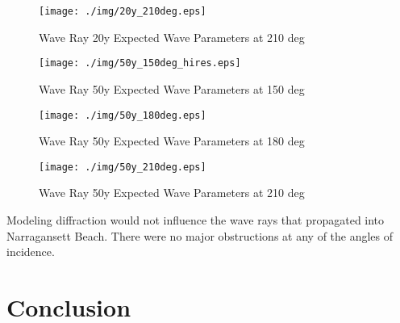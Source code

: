 \begin{figure}[H]
\centering
\texttt{[image: ./img/20y\_210deg.eps]}
\caption{Wave Ray 20y Expected Wave Parameters at 210 deg}
\label{fig:prob4WHvWD}
\end{figure}



\begin{figure}[H]
\centering
\texttt{[image: ./img/50y\_150deg\_hires.eps]}
\caption{Wave Ray 50y Expected Wave Parameters at 150 deg}
\label{fig:prob4WHvWD}
\end{figure}

\begin{figure}[H]
\centering
\texttt{[image: ./img/50y\_180deg.eps]}
\caption{Wave Ray 50y Expected Wave Parameters at 180 deg}
\label{fig:prob4WHvWD}
\end{figure}

\begin{figure}[H]
\centering
\texttt{[image: ./img/50y\_210deg.eps]}
\caption{Wave Ray 50y Expected Wave Parameters at 210 deg}
\label{fig:prob4WHvWD}
\end{figure}



Modeling diffraction would not influence the wave rays that propagated into Narragansett Beach. There were no major obstructions at any of the angles of incidence. 

\section{Conclusion}
